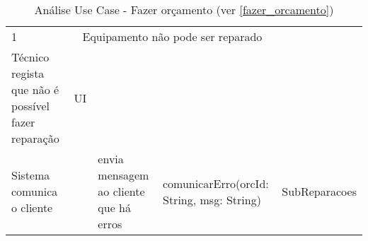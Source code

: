 \documentclass[../relatorio.tex]{subfiles}
\begin{document}
\begin{landscape}
\begin{table}[!h]
\begin{tabular}{|p{5cm}|p{1cm}|p{4cm}|p{6cm}|p{3cm}|}
            1 
                     & 
            \multicolumn{3}{c}{Equipamento não pode ser reparado}
            \\
            \rowcolor{yellow}
            \hline
            Técnico regista que não é possível fazer reparação
                     & 
            UI
                     & 
                     & 
                     & 
            \\
            \hline
            Sistema comunica o cliente
                     & 
                     & 
            envia mensagem ao cliente que há erros
                     & 
            comunicarErro(orcId: String, msg: String)
                     & 
            SubReparacoes
            \\
            \hline
        \end{tabular}
        \caption{Análise Use Case - Fazer orçamento (ver \ref{fazer_orcamento})}
    \end{table}
\end{landscape}
\end{document}
